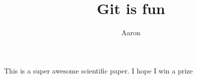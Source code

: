 \documentclass[10pt]{article}
\author{Aaron}
\title{Git is fun}
\begin{document}
	\maketitle
	
	This is a super awesome scientific paper.
	I hope I win a prize
\end{document}
